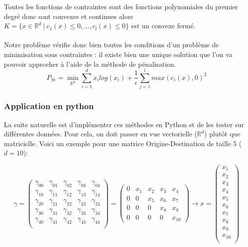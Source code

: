 \documentclass[12pt]{article}
\newcommand{\R}{\mathbb{R}}
\newcommand{\Rd}{\mathbb{R}^d}
\begin{document}
Toutes les fonctions de contraintes sont des fonctions polynomiales du premier degré donc sont convexes et continues alors $K = \{x \in \Rd \:|\: c_1(x) \leq 0, \dots, c_l(x) \leq 0 \}$ est un convexe fermé.\\
\\
Notre problème vérifie donc bien toutes les conditions d'un problème de minimisation sous contraintes : il existe bien une unique solution que l'on va pouvoir approcher à l'aide de la méthode de pénalisation.
\[P_{S\epsilon} = \min_{\R^d} \sum^d_{i=1} x_ilog(x_i) + \frac{1}{\epsilon} \sum^{l}_{j = 1}max(c_i(x),0)^2 \]
\subsubsection{Application en python}
La suite naturelle est d'implémenter ces méthodes en Python et de les tester sur différentes données. Pour cela, on doit passer en vue vectorielle ($\R^d$) plutôt que matricielle. Voici un exemple pour une matrice Origine-Destination de taille 5 ($d=10$):
\begin{adjustwidth}{-2cm}{-2cm}

\[
\gamma =
\begin{pmatrix}
\gamma_{00} & \gamma_{01} & \gamma_{02} &\gamma_{03} & \gamma_{04}\\
\gamma_{10} & \gamma_{11} & \gamma_{12} &\gamma_{13} & \gamma_{14}\\
\gamma_{20} & \gamma_{21} & \gamma_{22} &\gamma_{23} & \gamma_{24}\\
\gamma_{30} & \gamma_{31} & \gamma_{32} &\gamma_{33} & \gamma_{34}\\
\gamma_{40} & \gamma_{41} & \gamma_{42} &\gamma_{43} & \gamma_{44}\\
\end{pmatrix}
=
\begin{pmatrix}
0 & x_1 & x_2 & x_3 & x_4\\
0 & 0 & x_5 & x_6 & x_7\\
0 & 0 & 0 & x_8 & x_9\\
0 & 0 & 0 & 0 & x_{10}
\end{pmatrix}
\to x = 
\begin{pmatrix}
x_1\\
x_2\\
x_3\\
x_4\\
x_5\\
x_6\\
x_7\\
x_8\\
x_9\\
x_{10}\\
\end{pmatrix}
\]
\end{adjustwidth}
\end{document}
